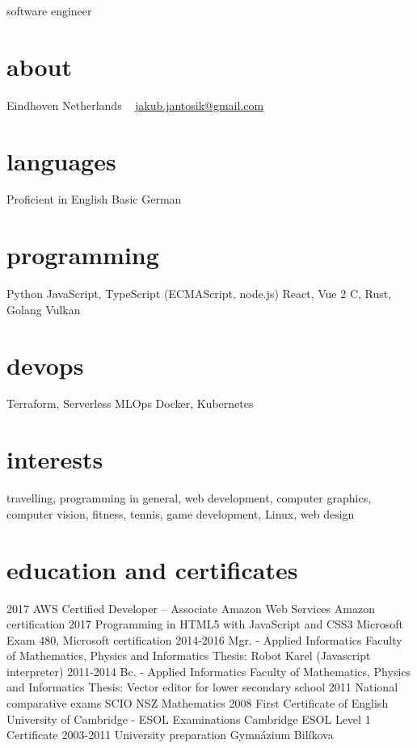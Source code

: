 \documentclass[]{friggeri-cv}
\begin{document}
{software engineer}

\begin{aside}
  \section{about}
  Eindhoven
  Netherlands
  ~
  \href{mailto:jakub.jantosik@gmail.com}{jakub.jantosik@gmail.com}
  \section{languages}
  Proficient in English
  Basic German
  \section{programming}
  Python
  JavaScript, TypeScript
  (ECMAScript, node.js)
  React, Vue 2
  C, Rust, Golang
  Vulkan
  \section{devops}
  Terraform, Serverless
  MLOps
  Docker, Kubernetes
\end{aside}

\section{interests}

travelling, programming in general, web development, computer graphics, computer vision, fitness, tennis, game development, Linux,  web design

\section{education and certificates}

\begin{entrylist}
  \entry
  {2017}
  {AWS Certified Developer – Associate}
  {Amazon Web Services}
  {Amazon certification}
  \entry
  {2017}
  {Programming in HTML5 with JavaScript and CSS3}
  {Microsoft}
  {Exam 480, Microsoft certification}
  \entry
  {2014-2016}
  {Mgr. - Applied Informatics}
  {Faculty of Mathematics, Physics and Informatics}
  {Thesis: Robot Karel (Javascript interpreter)}
  \entry
  {2011-2014}
  {Bc. - Applied Informatics}
  {Faculty of Mathematics, Physics and Informatics}
  {Thesis: Vector editor for lower secondary school}
  \entry
  {2011}
  {National comparative exams}
  {SCIO}
  {NSZ Mathematics}
  \entry
  {2008}
  {First Certificate of English}
  {University of Cambridge - ESOL Examinations}
  {Cambridge ESOL Level 1 Certificate}
  \entry
  {2003-2011}
  {University preparation}
  {Gymnázium Bilíkova}
  {}
\end{entrylist}
\end{document}
